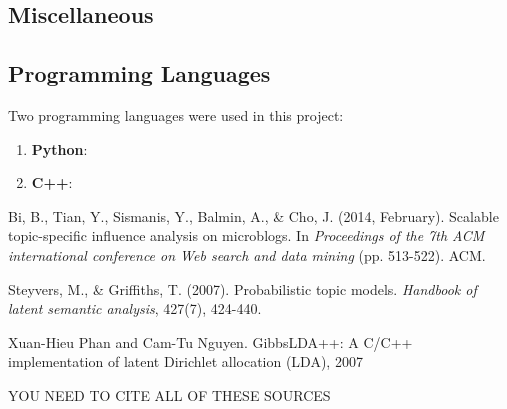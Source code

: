 \documentclass[a4paper]{article}
\begin{document}
\begin{multicols}{2}
\section{Miscellaneous}
\label{sec:misc}
\subsection{Programming Languages}
Two programming languages were used in this project:
\begin{enumerate}
\item \textbf{Python}: 
\item \textbf{C++}: 
\end{enumerate}

\end{multicols}

\begin{thebibliography}{9}
Bi, B., Tian, Y., Sismanis, Y., Balmin, A., \& Cho, J. (2014, February). Scalable topic-specific influence analysis on microblogs. In \textit{Proceedings of the 7th ACM international conference on Web search and data mining} (pp. 513-522). ACM.

Steyvers, M., \& Griffiths, T. (2007). Probabilistic topic models. \textit{Handbook of latent semantic analysis}, 427(7), 424-440.

Xuan-Hieu Phan and Cam-Tu Nguyen. GibbsLDA++: A C/C++ implementation of latent Dirichlet allocation (LDA), 2007

YOU NEED TO CITE ALL OF THESE SOURCES

\end{thebibliography}
\end{document}
